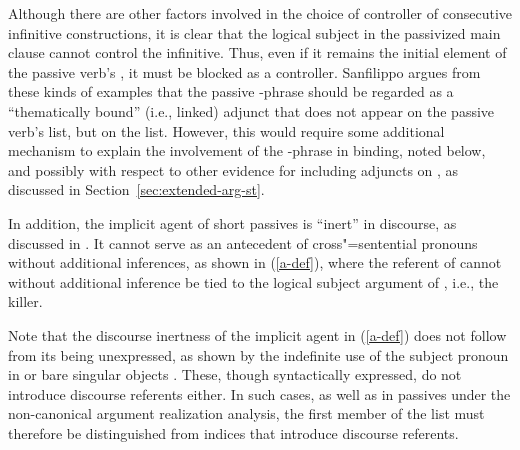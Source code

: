 \documentclass[output=paper,biblatex,babelshorthands,newtxmath,draftmode,colorlinks, citecolor=brown]{langscibook}
\begin{document}
Although there are other factors involved in the choice of controller of consecutive  infinitive constructions, it is clear that the logical subject in the passivized main clause cannot control the infinitive.
Thus, even if it remains the initial element of the passive verb's \argst, it must be blocked as a controller.
Sanfilippo argues from these kinds of examples that the passive -phrase should be regarded as a ``thematically bound'' (i.e., linked) adjunct that does
not appear on the passive verb's \argst list, but on the  list.
However, this would require some additional mechanism to explain the involvement of the -phrase in binding, noted below, and possibly with respect to other evidence for including adjuncts on \argst, as discussed in Section~\ref{sec:extended-arg-st}.

In addition, the implicit agent of short passives is ``inert'' in discourse, as discussed in \citet{KoenigandMauner1999}.
It cannot serve as an antecedent of cross"=sentential pronouns without additional inferences, as shown in (\ref{a-def}), where the referent of  cannot without additional inference be tied to the logical subject argument of , i.e., the killer.

\begin{exe}
\end{exe}

Note that the discourse inertness of the implicit agent in (\ref{a-def}) does not follow from its being unexpressed, as shown by the indefinite use of the subject pronoun  in  \citep[241--244]{Koenig1998c} or  bare singular objects \citep[89--108]{FarkasandDeSwart2003}.
These, though syntactically expressed, do not introduce discourse referents either.
In such cases, as well as in passives under the non-canonical argument realization analysis, the first member of the \argst list must therefore be distinguished from indices that introduce discourse referents.
\end{document}
